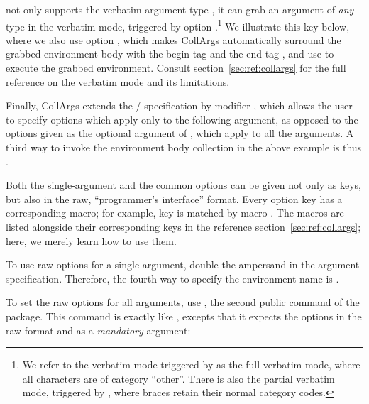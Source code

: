 \documentclass[a4paper,11pt]{article}
\begin{document}
 not only supports the verbatim argument
type , it can grab an argument of \emph{any} type in the
verbatim mode, triggered by option .\footnote{We refer to
  the verbatim mode triggered by  as the full verbatim
  mode, where all characters are of category ``other''.  There is also the
  partial verbatim mode, triggered by , where braces retain
  their normal category codes.} We illustrate this key below, where we also use
option , which makes CollArgs automatically surround the
grabbed environment body with the begin tag  and the end tag , and use
 to execute the grabbed environment.  Consult
section~\ref{sec:ref:collargs} for the full reference on the verbatim mode and
its limitations.


Finally, CollArgs extends the \slash{} specification
by modifier , which allows the user to specify options which
apply only to the following argument, as opposed to the options given as the
optional argument of , which apply to all the
arguments.  A third way to invoke the environment body collection in the above
example is thus %
.

Both the single-argument and the common options can be given not only as
 keys, but also in the raw, ``programmer's interface'' format.
Every option key has a corresponding macro; for example, key
 is matched by macro .
The macros are listed alongside their corresponding keys in the reference
section~\ref{sec:ref:collargs}; here, we merely learn how to use them.

To use raw options for a single argument, double the ampersand in the argument
specification.  Therefore, the fourth way to specify the environment name is
.

To set the raw options for all arguments, use , the
second public command of the package.  This command is exactly like
, excepts that it expects the options in the raw
format and as a \emph{mandatory} argument:
\end{document}
